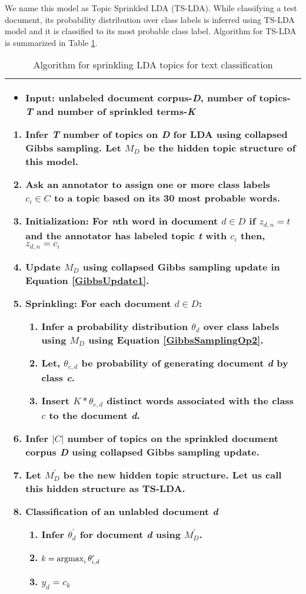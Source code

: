 \documentclass[11pt]{article}
\newcommand{\argmax}{\operatornamewithlimits{argmax}}
\begin{document}
We name this model as Topic Sprinkled LDA (TS-LDA). While classifying a test document, its probability distribution over class labels is inferred using TS-LDA model and it is classified to its most probable class label. 
Algorithm for TS-LDA is summarized in Table \ref{Chap2:Algo:GibbsSampling}.
\begin{table}[!t]\small
\centering 
\begin{tabular}{p{}}
\hline
\begin{itemize}
\item \textbf{Input:} unlabeled document corpus-\textit{D}, number of topics-\textit{T} and number of sprinkled terms-\textit{K}
\end{itemize}
\begin{enumerate}
\item Infer \textit{T} number of topics on \textit{D} for LDA using collapsed Gibbs sampling. Let $M_{D}$ be the hidden topic structure of this model.%
\item Ask an annotator to assign one or more class labels $c_i \in C$ to a topic based on its 30 most probable words.
\item \textbf{Initialization:} For \textit{n}th word in document $d \in D$
	  \newline if $z_{d,n}=t$ and the annotator has labeled topic \textit{t} with $c_i$ then, $z_{d,n}=c_i$
\item Update $M_D$ using collapsed Gibbs sampling update in Equation \ref{GibbsUpdate1}.
\item \textbf{Sprinkling:} For each document $d \in D$:
	\begin{enumerate}
	\item Infer a probability distribution $\theta_{d}$ over class labels using $M_D$ using Equation \ref{GibbsSamplingOp2}. 
	\item Let, $\theta_{c,d}$ be probability of generating document \textit{d} by class \textit{c}.
	\item Insert $K*\theta_{c,d}$ distinct words associated with the class $c$ to the document \textit{d}.
	\end{enumerate}	 
\item Infer $|C|$ number of topics on the sprinkled document corpus \textit{D} using collapsed Gibbs sampling update.
\item Let $M^{\prime}_D$ be the new hidden topic structure. Let us call this hidden structure as TS-LDA.
\item \textbf{Classification of an unlabled document \textit{d}}
	\begin{enumerate}
	\item Infer $\theta_{d}^{\prime}$ for document \textit{d} using $M_{D}^{\prime}$.
	\item $k = \argmax_i \theta^{\prime}_{i,d}$  
	\item $y_d = c_k$
	\end{enumerate}
\end{enumerate}
\tabularnewline \hline
\end{tabular}\caption{Algorithm for sprinkling LDA topics for text classification}
\label{Chap2:Algo:GibbsSampling} 
\end{table}
\end{document}
